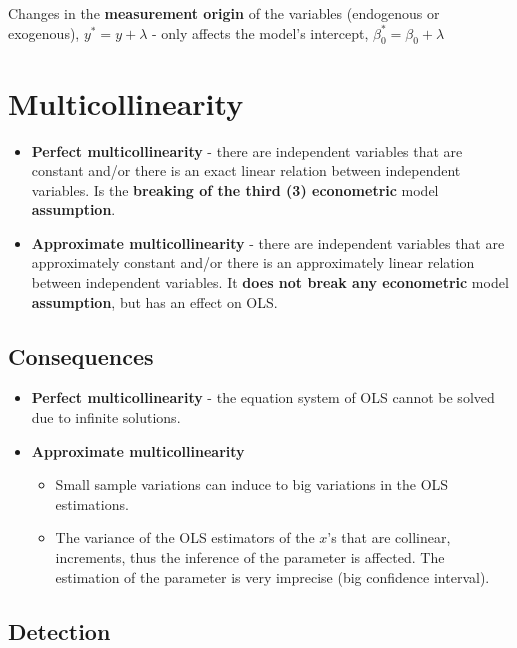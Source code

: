 \documentclass[10pt, a4paper, landscape]{article}
\begin{document}
\begin{multicols}{3}
		Changes in the \textbf{measurement origin} of the variables (endogenous or exogenous), $y^{*} = y + \lambda$ - only affects the model's intercept, $\beta_{0}^{*} = \beta_{0} + \lambda$
		
		\columnbreak
		
		\section*{Multicollinearity}
		
		\begin{itemize}[leftmargin=*]
			\item \textbf{Perfect multicollinearity} - there are independent variables that are constant and/or there is an exact linear relation between independent variables. Is the \textbf{breaking of the third (3) econometric} model \textbf{assumption}.
			\item \textbf{Approximate multicollinearity} - there are independent variables that are approximately constant and/or there is an approximately linear relation between independent variables. It \textbf{does not break any econometric} model \textbf{assumption}, but has an effect on OLS.
		\end{itemize}
		
		\subsection*{Consequences}
		
		\begin{itemize}[leftmargin=*]
			\item \textbf{Perfect multicollinearity} - the equation system of OLS cannot be solved due to infinite solutions.
			\item \textbf{Approximate multicollinearity}
			
			\begin{itemize}[leftmargin=*]
				\item Small sample variations can induce to big variations in the OLS estimations.
				\item The variance of the OLS estimators of the $x$'s that are collinear, increments, thus the inference of the parameter is affected. The estimation of the parameter is very imprecise (big confidence interval).
			\end{itemize}
		\end{itemize}
		
		\subsection*{Detection}
		

\end{multicols}
\end{document}
